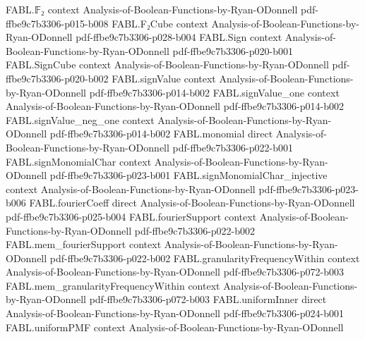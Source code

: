 \begin{theorem}
\label{FABL.allEqualStringTester_rejectionProbability_eq}
\leanok
{}
\proofstep
  {FABL.𝔽₂}
  {context}
  {Analysis-of-Boolean-Functions-by-Ryan-ODonnell}
  {pdf-ffbe9c7b3306-p015-b008}
\proofstep
  {FABL.F₂Cube}
  {context}
  {Analysis-of-Boolean-Functions-by-Ryan-ODonnell}
  {pdf-ffbe9c7b3306-p028-b004}
\proofstep
  {FABL.Sign}
  {context}
  {Analysis-of-Boolean-Functions-by-Ryan-ODonnell}
  {pdf-ffbe9c7b3306-p020-b001}
\proofstep
  {FABL.SignCube}
  {context}
  {Analysis-of-Boolean-Functions-by-Ryan-ODonnell}
  {pdf-ffbe9c7b3306-p020-b002}
\proofstep
  {FABL.signValue}
  {context}
  {Analysis-of-Boolean-Functions-by-Ryan-ODonnell}
  {pdf-ffbe9c7b3306-p014-b002}
\proofstep
  {FABL.signValue_one}
  {context}
  {Analysis-of-Boolean-Functions-by-Ryan-ODonnell}
  {pdf-ffbe9c7b3306-p014-b002}
\proofstep
  {FABL.signValue_neg_one}
  {context}
  {Analysis-of-Boolean-Functions-by-Ryan-ODonnell}
  {pdf-ffbe9c7b3306-p014-b002}
\proofstep
  {FABL.monomial}
  {direct}
  {Analysis-of-Boolean-Functions-by-Ryan-ODonnell}
  {pdf-ffbe9c7b3306-p022-b001}
\proofstep
  {FABL.signMonomialChar}
  {context}
  {Analysis-of-Boolean-Functions-by-Ryan-ODonnell}
  {pdf-ffbe9c7b3306-p023-b001}
\proofstep
  {FABL.signMonomialChar_injective}
  {context}
  {Analysis-of-Boolean-Functions-by-Ryan-ODonnell}
  {pdf-ffbe9c7b3306-p023-b006}
\proofstep
  {FABL.fourierCoeff}
  {direct}
  {Analysis-of-Boolean-Functions-by-Ryan-ODonnell}
  {pdf-ffbe9c7b3306-p025-b004}
\proofstep
  {FABL.fourierSupport}
  {context}
  {Analysis-of-Boolean-Functions-by-Ryan-ODonnell}
  {pdf-ffbe9c7b3306-p022-b002}
\proofstep
  {FABL.mem_fourierSupport}
  {context}
  {Analysis-of-Boolean-Functions-by-Ryan-ODonnell}
  {pdf-ffbe9c7b3306-p022-b002}
\proofstep
  {FABL.granularityFrequencyWithin}
  {context}
  {Analysis-of-Boolean-Functions-by-Ryan-ODonnell}
  {pdf-ffbe9c7b3306-p072-b003}
\proofstep
  {FABL.mem_granularityFrequencyWithin}
  {context}
  {Analysis-of-Boolean-Functions-by-Ryan-ODonnell}
  {pdf-ffbe9c7b3306-p072-b003}
\proofstep
  {FABL.uniformInner}
  {direct}
  {Analysis-of-Boolean-Functions-by-Ryan-ODonnell}
  {pdf-ffbe9c7b3306-p024-b001}
\proofstep
  {FABL.uniformPMF}
  {context}
  {Analysis-of-Boolean-Functions-by-Ryan-ODonnell}

\end{theorem}
